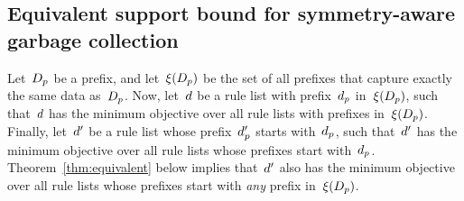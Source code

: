 \begin{arxiv}

\end{arxiv}

\subsection{Equivalent support bound for symmetry-aware garbage collection}
\label{sec:equivalent}

Let~$D_p$ be a prefix, and let~$\xi(D_p)$ be the set
of all prefixes that capture exactly the same data as~$D_p$.
%
Now, let~${d}$ be a rule list with prefix~$d_p$
in~$\xi(D_p)$, such that~${d}$ has the minimum objective
over all rule lists with prefixes in~$\xi(D_p)$.
%
Finally, let~${d}'$ be a rule list whose prefix~$d_p'$
starts with~$d_p$, such that~${d}'$ has the minimum objective
over all rule lists whose prefixes start with~$d_p$.
%
Theorem~\ref{thm:equivalent} below implies that~${d}'$ also has
the minimum objective over all rule lists whose prefixes start with
\emph{any} prefix in~$\xi(D_p)$.

